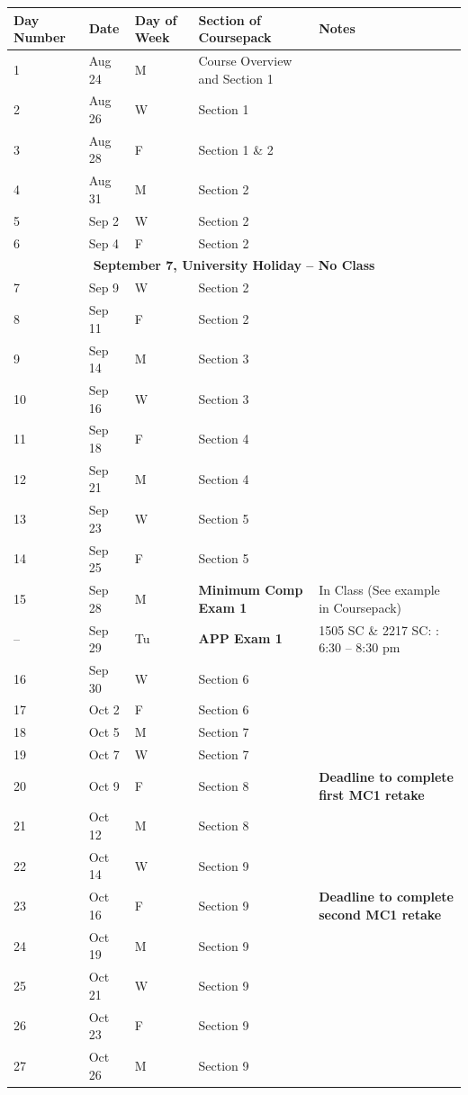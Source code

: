 \documentclass[11pt,article,oneside]{memoir}
\begin{document}
\newpage
\begin{small}
\begin{tabular}{lllll}
\toprule 
Day Number & Date & Day of Week & Section of Coursepack & Notes \\
\midrule
1 & Aug 24 & M & Course Overview and Section 1 & \\
2 & Aug 26 & W & Section 1 & \\
3 & Aug 28 & F & Section 1 \& 2 & \\
4 & Aug 31 & M & Section 2 & \\
5 & Sep 2 & W & Section 2 & \\
6 & Sep 4 & F & Section 2 & \\
\multicolumn{5}{c}{\textbf{September 7, University Holiday -- No Class}} \\
7 & Sep 9 & W & Section 2 & \\
8 & Sep 11 & F & Section 2 & \\
9 & Sep 14 & M & Section 3 & \\
10 & Sep 16 & W & Section 3 & \\
11 & Sep 18 & F & Section 4 & \\
12 & Sep 21 & M & Section 4 & \\
13 & Sep 23 & W & Section 5 & \\
14 & Sep 25 & F & Section 5 & \\
15 & Sep 28 & M & \textbf{Minimum Comp Exam 1} & In Class (See example in Coursepack) \\
-- & Sep 29 & Tu & \textbf{APP Exam 1} & 1505 SC \& 2217 SC: : 6:30 -- 8:30 pm \\
16 & Sep 30 & W & Section 6 & \\
17 & Oct 2 & F & Section 6 & \\
18 & Oct 5 & M & Section 7 & \\
19 & Oct 7 & W & Section 7 & \\
20 & Oct 9 & F & Section 8 & \textbf{Deadline to complete first MC1 retake} \\
21 & Oct 12 & M & Section 8 & \\
22 & Oct 14 & W & Section 9 & \\
23 & Oct 16 & F & Section 9 & \textbf{Deadline to complete second MC1 retake} \\
24 & Oct 19 & M & Section 9 & \\
25 & Oct 21 & W & Section 9 & \\
26 & Oct 23 & F & Section 9 & \\
27 & Oct 26 & M & Section 9 & \\

\end{tabular}
\end{small}
\end{document}
